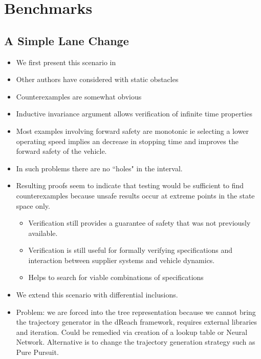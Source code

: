 \documentclass{easychair}
\theoremstyle{theorem}
\theoremstyle{remark}
\begin{document}
\section{Benchmarks}
\subsection{A Simple Lane Change}
\begin{itemize}
	\item We first present this scenario in \cite{blah}
	\item Other authors \cite{blah} have considered with static obstacles
	\item Counterexamples are somewhat obvious
	\item Inductive invariance argument allows verification of infinite time properties
		\item Most examples involving forward safety are monotonic ie selecting a lower operating speed implies an decrease in stopping time and improves the forward safety of the vehicle. 
		\item In such problems there are no ``holes" in the interval. 
		\item Resulting proofs seem to indicate that testing would be sufficient to find counterexamples because unsafe results occur at extreme points in the state space only.
		\begin{itemize}
			\item Verification still provides a guarantee of safety that was not previously available. 
			\item Verification is still useful for formally verifying specifications and interaction between supplier systems and vehicle dynamics.
			\item Helps to search for viable combinations of specifications
		\end{itemize}
	\item We extend this scenario with differential inclusions. 
	\item Problem: we are forced into the tree representation because we cannot bring the trajectory generator in the dReach framework, requires external libraries and iteration. Could be remedied via creation of a lookup table or Neural Network. Alternative is to change the trajectory generation strategy such as Pure Pursuit.
\end{itemize}
\end{document}
